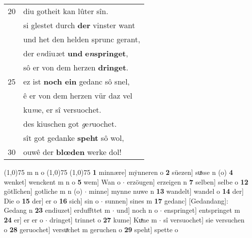 \documentclass[8pt,a4paper,notitlepage]{article}
\begin{document}
\begin{table}[ht]
\begin{minipage}[t]{0.5\linewidth}
\begin{tabular}{rl}
20 & diu gotheit kan lûter sîn.\\ 
 & si glestet durch \textbf{der} vinster want\\ 
 & und het den helden sprunc gerant,\\ 
 & der e\textit{n}diu\textit{z}et \textbf{und} \textbf{e\textit{n}springet},\\ 
 & sô er von dem herzen \textbf{dringet}.\\ 
25 & ez ist \textbf{noch ein} gedanc sô snel,\\ 
 & ê er von dem herzen vür daz vel\\ 
 & ku\textit{m}e, er sî versuochet.\\ 
 & des kiuschen got \textit{g}e\textit{r}uochet.\\ 
 & sît got gedanke \textbf{speht} sô wol,\\ 
30 & ouwê der \textbf{blœden} werke dol!\\ 
\end{tabular}
\scriptsize
\line(1,0){75} \newline
m n o \newline
\line(1,0){75} \newline
\newline
\line(1,0){75} \newline
\textbf{1} minnære] mẏnneren o \textbf{2} süezen] suͯsse n (o) \textbf{4} wenket] wenckent m n o \textbf{5} wem] Wan o  $\cdot$ erzöugen] erzeigen n \textbf{7} selben] selbe o \textbf{12} götlîchen] gotliche m n (o)  $\cdot$ minne] mynne nuwe n \textbf{13} wandelt] wandel o \textbf{14} der] Die o \textbf{15} der] er o \textbf{16} sich] sin o  $\cdot$ sunnen] sines m \textbf{17} gedanc] [Gedandang]: Gedang n \textbf{23} endiuzet] erduffttet m  $\cdot$ und] noch n o  $\cdot$ enspringet] entspringet m \textbf{24} er] er er o  $\cdot$ dringet] trinnet o \textbf{27} kume] Kuͯne m  $\cdot$ sî versuochet] sie versuchen o \textbf{28} geruochet] versuͯchet m geruchen o \textbf{29} speht] spette o \newline
\end{minipage}
\end{table}
\newpage
\end{document}
